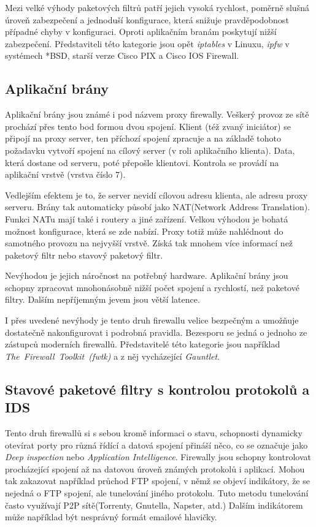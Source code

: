 \documentclass[11pt,a4paper]{article}
\begin{document}
Mezi velké výhody paketových filtrů patří jejich vysoká rychlost, poměrně slušná úroveň zabezpečení a jednoduší konfigurace, která snižuje pravděpodobnost případné chyby v konfiguraci. Oproti aplikačním branám poskytují nižší zabezpečení. Představiteli této kategorie jsou opět \textit{iptables} v Linuxu, \textit{ipfw} v systémech *BSD, starší verze Cisco PIX a Cisco IOS Firewall.

\subsection{Aplikační brány}
Aplikační brány jsou známé i pod názvem proxy firewally. Veškerý provoz ze sítě prochází přes tento bod formou dvou spojení. Klient (též zvaný iniciátor) se připojí na proxy server, ten příchozí spojení zpracuje a na základě tohoto požadavku vytvoří spojení na cílový server (v roli aplikačního klienta). Data, která dostane od serveru, poté přepošle klientovi. Kontrola se provádí na aplikační vrstvě (vrstva číslo 7).

Vedlejším efektem je to, že server nevidí cílovou adresu klienta, ale adresu proxy serveru. Brány tak automaticky působí jako NAT(Network Address Translation). Funkci NATu mají také i routery a jiné zařízení. Velkou výhodou je bohatá možnost konfigurace, která se zde nabízí. Proxy totiž může nahlédnout do samotného provozu na nejvyšší vrstvě. Získá tak mnohem více informací než paketový filtr nebo stavový paketový filtr.

Nevýhodou je jejich náročnost na potřebný hardware. Aplikační brány jsou schopny zpracovat mnohonásobně nižší počet spojení a rychlostí, než paketové filtry. Dalším nepříjemným jevem jsou větší latence.  

I přes uvedené nevýhody je tento druh firewallu velice bezpečným a umožňuje dostatečně nakonfigurovat i podrobná pravidla. Bezesporu se jedná o jednoho ze zástupců moderních firewallů. Představitelé této kategorie jsou například \textit{The~Firewall~Toolkit~(fwtk)} a z něj vycházející \textit{Gauntlet}.

\subsection{Stavové paketové filtry s kontrolou protokolů a IDS}
Tento druh firewallů si s sebou kromě informaci o stavu, schopnosti dynamicky otevírat porty pro různá řídící a datová spojení přináší něco, co se označuje jako \textit{Deep inspection} nebo \textit{Application Intelligence}. Firewally jsou schopny kontrolovat procházející spojení až na datovou úroveň známých protokolů i aplikací. Mohou tak zakazovat například průchod FTP spojení, v němž se objeví indikátory, že se nejedná o FTP spojení, ale tunelování jiného protokolu. Tuto metodu tunelování často využívají P2P sítě(Torrenty, Gnutella, Napster, atd.) Dalším indikátorem může například být nesprávný formát emailové hlavičky. 
\end{document}
